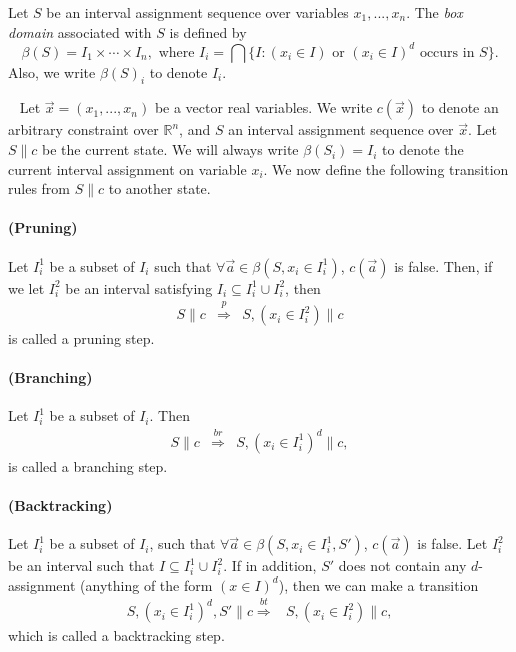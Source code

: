 \documentclass[envcountsect]{llncs}
\begin{document}
\begin{definition}
Let $S$ be an interval assignment sequence over variables $x_1,...,x_n$. The
{\em box
domain} associated with $S$ is defined by
$$\beta(S) = I_1\times\cdots \times I_n, \mbox{ where }I_i = \bigcap\{ I:
(x_i\in
I)\mbox{ or } (x_i\in I)^d \mbox{ occurs in } S\}.$$
Also, we write $\beta(S)_i$ to denote $I_i$.
\end{definition}

\begin{definition}~\label{transitions} Let $\vec x =
(x_1,...,x_n)$ be a vector real variables. We write $c(\vec x)$ to denote an
arbitrary constraint over $\mathbb{R}^n$, and
$S$ an interval assignment sequence over $\vec x$. Let $S\parallel c$ be the
current state. We will always write $\beta(S_i) = I_i$ to denote the current
interval assignment on variable $x_i$. We now define the following transition
rules from $S\parallel c$ to another state.
\paragraph{(Pruning)} Let $I_i^1$ be a subset of $I_i$ such that $\forall \vec
a\in \beta(S,x_i\in I_i^1)$, $c(\vec a)$ is false. Then, if we let $I_i^2$ be an
interval satisfying $I_i\subseteq I_i^1 \cup I_i^2$, then
\begin{eqnarray*}
S\parallel c &\stackrel{p}{\Longrightarrow}& S, (x_i\in I_i^2)\parallel c
\end{eqnarray*}
is called a pruning step.
\paragraph{(Branching)}Let $I_i^1$ be a subset of $I_i$. Then
\begin{eqnarray*}
S\parallel c &\stackrel{br}{\Longrightarrow}& S, (x_i\in I_i^1)^d \parallel c,
\end{eqnarray*}
is called a branching step.

\paragraph{(Backtracking)} Let $I_i^1$ be a subset of $I_i$, such that $\forall
\vec a\in \beta(S,x_i\in I_i^1, S')$, $c(\vec a)$ is false. Let $I_i^2$ be an
interval such that $I\subseteq I_i^1\cup I_i^2$. If in addition, $S'$ does not
contain any $d$-assignment (anything of the form $(x\in I)^d$), then we can make
a transition
\begin{eqnarray*}
S, (x_i\in I_i^1)^d, S'\parallel c \stackrel{bt}{\Longrightarrow}& S, (x_i\in
 I_i^2) \parallel c,
\end{eqnarray*}
which is called a backtracking step.


\end{definition}
\end{document}
